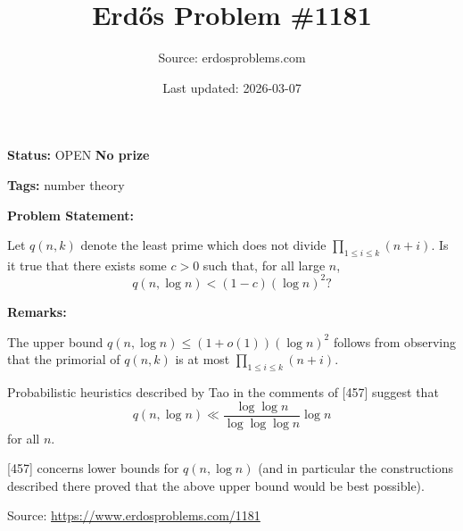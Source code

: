 \documentclass{article}
\title{Erd\H{o}s Problem \#1181}
\date{Last updated: 2026-03-07}
\author{Source: erdosproblems.com}
\begin{document}
\maketitle

\noindent\textbf{Status:} OPEN \quad \textbf{No prize}

\noindent\textbf{Tags:} number theory

\medskip
\noindent\textbf{Problem Statement:}

Let $q(n,k)$ denote the least prime which does not divide $\prod_{1\leq i\leq k}(n+i)$. Is it true that there exists some $c>0$ such that, for all large $n$,\[q(n,\log n)<(1-c)(\log n)^2?\]

\bigskip
\noindent\textbf{Remarks:}

The upper bound $q(n,\log n)\leq (1+o(1))(\log n)^2$ follows from observing that the primorial of $q(n,k)$ is at most $\prod_{1\leq i\leq k}(n+i)$.

Probabilistic heuristics described by Tao in the comments of [457] suggest that\[q(n,\log n)\ll \frac{\log\log n}{\log\log\log n}{\log n}\]for all $n$. 

[457] concerns lower bounds for $q(n,\log n)$ (and in particular the constructions described there proved that the above upper bound would be best possible).

\bigskip
\noindent\small{Source: \url{https://www.erdosproblems.com/1181}}
\end{document}

